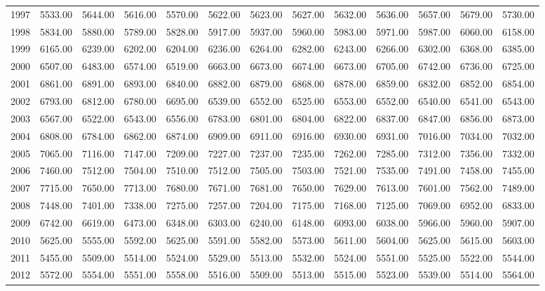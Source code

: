 \begin{longtable}{rrrrrrrrrrrrr}
  1997 & 5533.00 & 5644.00 & 5616.00 & 5570.00 & 5622.00 & 5623.00 & 5627.00 & 5632.00 & 5636.00 & 5657.00 & 5679.00 & 5730.00 \\ 
  1998 & 5834.00 & 5880.00 & 5789.00 & 5828.00 & 5917.00 & 5937.00 & 5960.00 & 5983.00 & 5971.00 & 5987.00 & 6060.00 & 6158.00 \\ 
  1999 & 6165.00 & 6239.00 & 6202.00 & 6204.00 & 6236.00 & 6264.00 & 6282.00 & 6243.00 & 6266.00 & 6302.00 & 6368.00 & 6385.00 \\ 
  2000 & 6507.00 & 6483.00 & 6574.00 & 6519.00 & 6663.00 & 6673.00 & 6674.00 & 6673.00 & 6705.00 & 6742.00 & 6736.00 & 6725.00 \\ 
  2001 & 6861.00 & 6891.00 & 6893.00 & 6840.00 & 6882.00 & 6879.00 & 6868.00 & 6878.00 & 6859.00 & 6832.00 & 6852.00 & 6854.00 \\ 
  2002 & 6793.00 & 6812.00 & 6780.00 & 6695.00 & 6539.00 & 6552.00 & 6525.00 & 6553.00 & 6552.00 & 6540.00 & 6541.00 & 6543.00 \\ 
  2003 & 6567.00 & 6522.00 & 6543.00 & 6556.00 & 6783.00 & 6801.00 & 6804.00 & 6822.00 & 6837.00 & 6847.00 & 6856.00 & 6873.00 \\ 
  2004 & 6808.00 & 6784.00 & 6862.00 & 6874.00 & 6909.00 & 6911.00 & 6916.00 & 6930.00 & 6931.00 & 7016.00 & 7034.00 & 7032.00 \\ 
  2005 & 7065.00 & 7116.00 & 7147.00 & 7209.00 & 7227.00 & 7237.00 & 7235.00 & 7262.00 & 7285.00 & 7312.00 & 7356.00 & 7332.00 \\ 
  2006 & 7460.00 & 7512.00 & 7504.00 & 7510.00 & 7512.00 & 7505.00 & 7503.00 & 7521.00 & 7535.00 & 7491.00 & 7458.00 & 7455.00 \\ 
  2007 & 7715.00 & 7650.00 & 7713.00 & 7680.00 & 7671.00 & 7681.00 & 7650.00 & 7629.00 & 7613.00 & 7601.00 & 7562.00 & 7489.00 \\ 
  2008 & 7448.00 & 7401.00 & 7338.00 & 7275.00 & 7257.00 & 7204.00 & 7175.00 & 7168.00 & 7125.00 & 7069.00 & 6952.00 & 6833.00 \\ 
  2009 & 6742.00 & 6619.00 & 6473.00 & 6348.00 & 6303.00 & 6240.00 & 6148.00 & 6093.00 & 6038.00 & 5966.00 & 5960.00 & 5907.00 \\ 
  2010 & 5625.00 & 5555.00 & 5592.00 & 5625.00 & 5591.00 & 5582.00 & 5573.00 & 5611.00 & 5604.00 & 5625.00 & 5615.00 & 5603.00 \\ 
  2011 & 5455.00 & 5509.00 & 5514.00 & 5524.00 & 5529.00 & 5513.00 & 5532.00 & 5524.00 & 5551.00 & 5525.00 & 5522.00 & 5544.00 \\ 
  2012 & 5572.00 & 5554.00 & 5551.00 & 5558.00 & 5516.00 & 5509.00 & 5513.00 & 5515.00 & 5523.00 & 5539.00 & 5514.00 & 5564.00 \\ 

\end{longtable}
